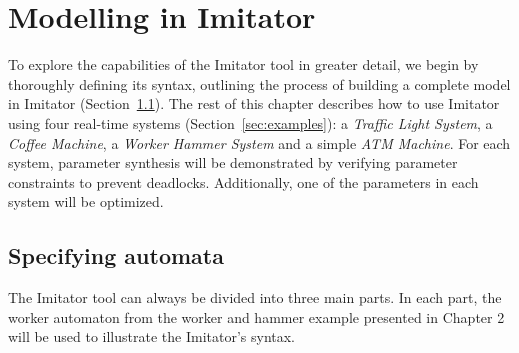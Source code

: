 
\chapter{Modelling in Imitator}


To explore the capabilities of the Imitator tool in greater detail, we begin by thoroughly defining its syntax, outlining the process of building a complete model in Imitator (Section~\ref{sec:specifying_automata}). The rest of this chapter describes how to use Imitator using four real-time systems (Section~\ref{sec:examples}): a \emph{Traffic Light System}, a \emph{Coffee Machine}, a \emph{Worker Hammer System} and a simple \emph{ATM Machine}. For each system, parameter synthesis will be demonstrated by verifying parameter constraints to prevent deadlocks. Additionally, one of the parameters in each system will be optimized.

\section{Specifying automata}\label{sec:specifying_automata}

The Imitator tool can always be divided into three main parts. In each part, the worker automaton from the worker and hammer example presented in Chapter 2 will be used to illustrate the Imitator's syntax.

\newcommand{\kw}[1]{\texttt{\textbf{\textcolor{blue!80!black}{#1}}}}

